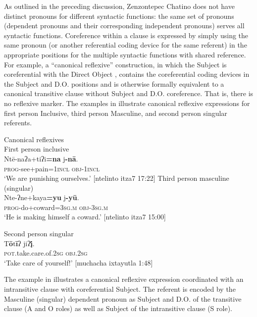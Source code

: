 \documentclass[output=paper]{../langscibook}
\begin{document}
As outlined in the preceding discussion, Zenzontepec Chatino does not have distinct pronouns for different syntactic functions: the same set of pronouns (dependent pronouns and their corresponding independent pronouns) serves all syntactic functions. Coreference within a clause is expressed by simply using the same pronoun (or another referential coding device for the same referent) in the appropriate positions for the multiple syntactic functions with shared reference. For example, a “canonical reflexive” construction, in which the Subject is coreferential with the Direct Object \citep[268]{Kulikov2013}, contains the coreferential coding devices in the Subject and D.O. positions and is otherwise formally equivalent to a canonical transitive clause without Subject and D.O. coreference. That is, there is no reflexive marker. The examples in  illustrate canonical reflexive expressions for first person Inclusive, third person Masculine, and second person singular referents.


\ea\label{ex:campbell:22}
{Canonical reflexives} \\
\ea\label{ex:campbell:22a}
{   First person inclusive}\\
\gll Ntē-naʔa+tiʔi\textbf{=na}  j\textbf{{}-nā}.\\
     \textsc{prog}{}-see+pain=\textsc{1incl}  \textsc{obj}{}-\textsc{1incl}\\
\glt ‘We are punishing ourselves.’ [ntelinto itza7 17:22]
\ex\label{ex:campbell:22b}
{   Third person masculine (singular)}\\
\gll Nte-ʔne+kaya\textbf{=yu}  j\textbf{{}-yū}.\\
     \textsc{prog}{}-do+coward=\textsc{3sg}.\textsc{m}  \textsc{obj}{}-\textsc{3sg}.\textsc{m}\\
\glt ‘He is making himself a coward.’ [ntelinto itza7 15:00]

\ex\label{ex:campbell:22c}
{   Second person singular}\\
\gll T\textbf{ō}t\textbf{ī}ʔ  jiʔ\textbf{į́}.\\
     \textsc{pot}.take.care.of.\textsc{2sg}  \textsc{obj}.\textsc{2sg}\\
\glt ‘Take care of yourself!’ [muchacha ixtayutla 1:48]
\z
\z


The example in  illustrates a canonical reflexive expression coordinated with an intransitive clause with coreferential Subject. The referent is encoded by the Masculine (singular) dependent pronoun as Subject and D.O. of the transitive clause (A and O roles) as well as Subject of the intransitive clause (S role).\\
\end{document}
